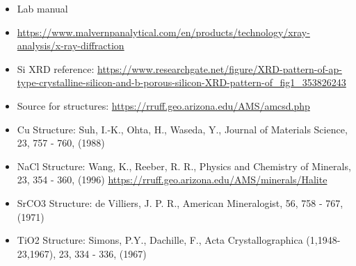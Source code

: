 \documentclass[11pt]{article}
\begin{document}
	\begin{itemize}
		\item Lab manual
		\item \href{https://www.malvernpanalytical.com/en/products/technology/xray-analysis/x-ray-diffraction}{https://www.malvernpanalytical.com/en/products/technology/xray-analysis/x-ray-diffraction}
		\item Si XRD reference: \href{https://www.researchgate.net/figure/XRD-pattern-of-ap-type-crystalline-silicon-and-b-porous-silicon-XRD-pattern-of_fig1_353826243}{https://www.researchgate.net/figure/XRD-pattern-of-ap-type-crystalline-silicon-and-b-porous-silicon-XRD-pattern-of\_fig1\_353826243}
		\item Source for structures: \href{https://rruff.geo.arizona.edu/AMS/amcsd.php}{https://rruff.geo.arizona.edu/AMS/amcsd.php}
		\item Cu Structure: Suh, I.-K., Ohta, H., Waseda, Y., Journal of Materials Science, 23, 757 - 760, (1988)
		\item NaCl Structure: Wang, K., Reeber, R. R., Physics and Chemistry of Minerals, 23, 354 - 360, (1996) \href{https://rruff.geo.arizona.edu/AMS/minerals/Halite}{https://rruff.geo.arizona.edu/AMS/minerals/Halite}
		\item SrCO3 Structure: de Villiers, J. P. R., American Mineralogist, 56, 758 - 767, (1971)
		\item TiO2 Structure: Simons, P.Y., Dachille, F., Acta Crystallographica (1,1948-23,1967), 23, 334 - 336, (1967)
	\end{itemize}
	
\end{document}
